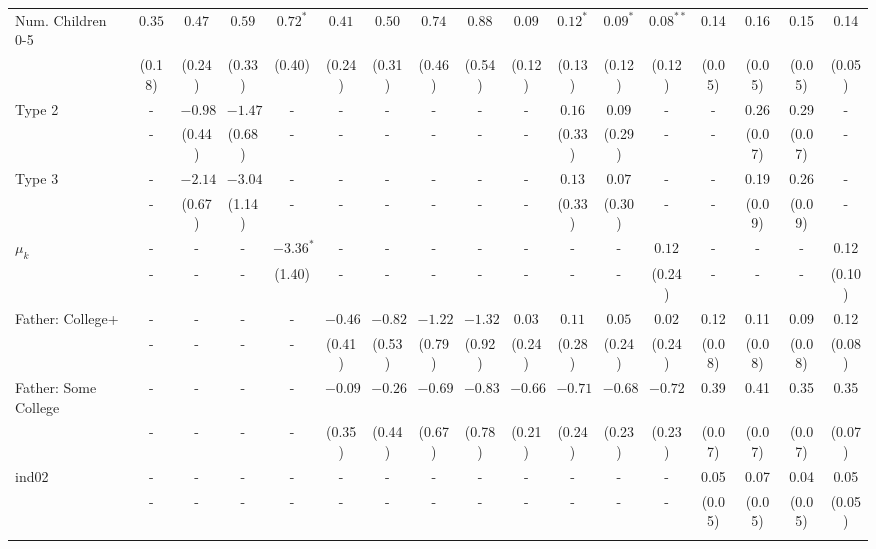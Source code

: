 \begin{tabular}{lcccccccccccccccc}
Num. Children 0-5&$0.35$&$0.47$&$0.59$&$0.72^{*}$&$0.41$&$0.50$&$0.74$&$0.88$&$0.09$&$0.12^{*}$&$0.09^{*}$&$0.08^{**}$&0.14&0.16&0.15&0.14\\
&(0.18)&(0.24)&(0.33)&(0.40)&(0.24)&(0.31)&(0.46)&(0.54)&(0.12)&(0.13)&(0.12)&(0.12)&(0.05)&(0.05)&(0.05)&(0.05)\\
Type 2&-&$-0.98$&$-1.47$&-&-&-&-&-&-&$0.16$&$0.09$&-&-&0.26&0.29&-\\
&-&(0.44)&(0.68)&-&-&-&-&-&-&(0.33)&(0.29)&-&-&(0.07)&(0.07)&-\\
Type 3&-&$-2.14$&$-3.04$&-&-&-&-&-&-&$0.13$&$0.07$&-&-&0.19&0.26&-\\
&-&(0.67)&(1.14)&-&-&-&-&-&-&(0.33)&(0.30)&-&-&(0.09)&(0.09)&-\\
$\mu_{k}$&-&-&-&$-3.36^{*}$&-&-&-&-&-&-&-&$0.12$&-&-&-&0.12\\
&-&-&-&(1.40)&-&-&-&-&-&-&-&(0.24)&-&-&-&(0.10)\\
Father: College+&-&-&-&-&$-0.46$&$-0.82$&$-1.22$&$-1.32$&$0.03$&$0.11$&$0.05$&$0.02$&0.12&0.11&0.09&0.12\\
&-&-&-&-&(0.41)&(0.53)&(0.79)&(0.92)&(0.24)&(0.28)&(0.24)&(0.24)&(0.08)&(0.08)&(0.08)&(0.08)\\
Father: Some College&-&-&-&-&$-0.09$&$-0.26$&$-0.69$&$-0.83$&$-0.66$&$-0.71$&$-0.68$&$-0.72$&0.39&0.41&0.35&0.35\\
&-&-&-&-&(0.35)&(0.44)&(0.67)&(0.78)&(0.21)&(0.24)&(0.23)&(0.23)&(0.07)&(0.07)&(0.07)&(0.07)\\
ind02&-&-&-&-&-&-&-&-&-&-&-&-&0.05&0.07&0.04&0.05\\
&-&-&-&-&-&-&-&-&-&-&-&-&(0.05)&(0.05)&(0.05)&(0.05)\\
\\
\bottomrule\end{tabular}